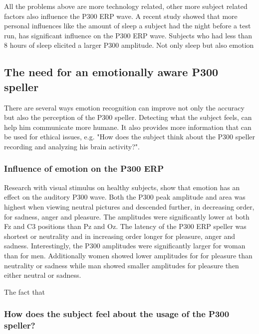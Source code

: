 All the problems above are more technology related, other more subject related factors also influence the P300 ERP wave. A recent study showed that more personal influences like the amount of sleep a subject had the night before a test run, has significant influence on the P300 ERP wave. Subjects who had less than 8 hours of sleep elicited a larger P300 amplitude\cite{HowManyPeople}. Not only sleep but also emotion



\subsection{The need for an emotionally aware P300 speller}

There are several ways emotion recognition can improve not only the accuracy but also the perception of the P300 speller. Detecting what the subject feels, can help him communicate more humane. It also provides more information that can be used for ethical issues, e.g. "How does the subject think about the P300 speller recording and analyzing his brain activity?".

\subsubsection{Influence of emotion on the P300 ERP}

Research with visual stimulus on healthy subjects, show that emotion has an effect on the auditory P300 wave\cite{AuditoryP300Effect}. Both the P300 peak amplitude and area was highest when viewing neutral pictures and descended further, in decreasing order, for sadness, anger and pleasure. The amplitudes were significantly lower at both Fz and C3 positions than Pz and Oz. The latency of the P300 ERP speller was shortest or neutrality and in increasing order longer for pleasure, anger and sadness. Interestingly, the P300 amplitudes were significantly larger for woman than for men. Additionally women showed lower amplitudes for for pleasure than neutrality or sadness while man showed smaller amplitudes for pleasure then either neutral or sadness. 

\npar

The fact that 



\subsubsection{How does the subject feel about the usage of the P300 speller?}


